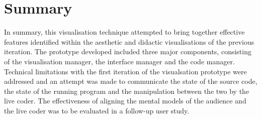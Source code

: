 






\section{Summary}

In summary, this visualisation technique attempted to bring together effective features identified within the aesthetic and didactic visualisations of the previous iteration. The prototype developed included three major components, consisting of the visualisation manager, the interface manager and the code manager. Technical limitations with the first iteration of the visualsation prototype were addressed and an attempt was made to communicate the state of the source code, the state of the running program and the manipulation between the two by the live coder. The effectiveness of aligning the mental models of the audience and the live coder was to be evaluated in a follow-up user study.


